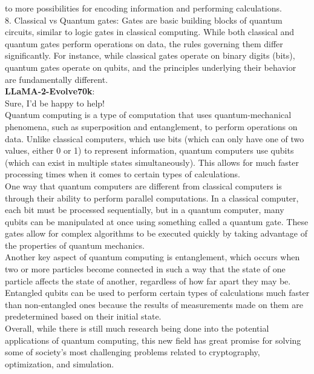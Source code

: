 \documentclass{article} %
\newcommand{\llama}{LLaMA}
\begin{document}
\begin{tcolorbox}[breakable,boxrule=0pt]
to more possibilities for encoding information and performing calculations.\\8. Classical vs Quantum gates: Gates are basic building blocks of quantum circuits, similar to logic gates in classical computing. While both classical and quantum gates perform operations on data, the rules governing them differ significantly. For instance, while classical gates operate on binary digits (bits), quantum gates operate on qubits, and the principles underlying their behavior are fundamentally different.\\
  \textbf{\llama{}-2-Evolve70k}: \\ Sure, I'd be happy to help! \\Quantum computing is a type of computation that uses quantum-mechanical phenomena, such as superposition and entanglement, to perform operations on data. Unlike classical computers, which use bits (which can only have one of two values, either 0 or 1) to represent information, quantum computers use qubits (which can exist in multiple states simultaneously). This allows for much faster processing times when it comes to certain types of calculations.\\One way that quantum computers are different from classical computers is through their ability to perform parallel computations. In a classical computer, each bit must be processed sequentially, but in a quantum computer, many qubits can be manipulated at once using something called a quantum gate. These gates allow for complex algorithms to be executed quickly by taking advantage of the properties of quantum mechanics.\\Another key aspect of quantum computing is entanglement, which occurs when two or more particles become connected in such a way that the state of one particle affects the state of another, regardless of how far apart they may be. Entangled qubits can be used to perform certain types of calculations much faster than non-entangled ones because the results of measurements made on them are predetermined based on their initial state.\\Overall, while there is still much research being done into the potential applications of quantum computing, this new field has great promise for solving some of society's most challenging problems related to cryptography, optimization, and simulation. \\

\end{tcolorbox}
\end{document}
